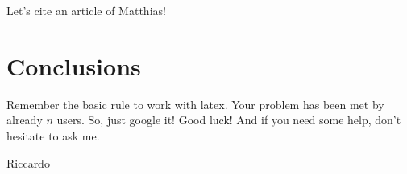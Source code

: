 Let's cite an article of Matthias!  \cite{Perdekamp:2015vwa}

\section{Conclusions} 
Remember the basic rule to work with latex. Your problem has been met by already $n$ users. So, just google it! 
Good luck! And if you need some help, don't hesitate to ask me. 

Riccardo 
